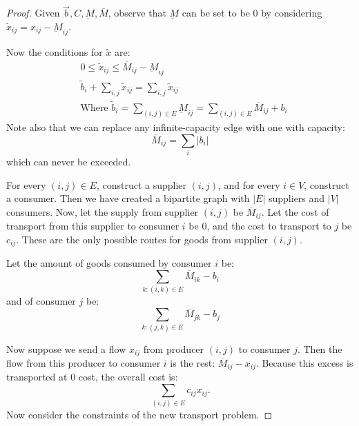 \documentclass[../Main.tex]{subfiles}
\begin{document}
\begin{proof}
    Given $\vec{b}, C, \underbar{M}, \overline{M}$, observe that $\underbar{M}$ can be set to be $0$ by considering $\tilde{x}_{ij} = x_{ij} - \underbar{M}_{ij}$.

    Now the conditions for $\tilde{x}$ are:
    \begin{align*}
        &0 \leq \tilde{x}_{ij} \leq \overline{M}_{ij} - \underbar{M}_{ij} \\
        &\tilde{b}_i + \sum_{i, j} \tilde{x}_{ij} = \sum_{i, j} \tilde{x}_{ij} \\
        &\text{Where } \tilde{b}_i = \sum_{(i, j) \in E} \underbar{M}_{ij} = \sum_{(i, j) \in E} \overline{M}_{ij} + b_i
    \end{align*}
    Note also that we can replace any infinite-capacity edge with one with capacity:
    \begin{equation*}
        \overline{M}_{ij} = \sum_i |b_i|
    \end{equation*}
    which can never be exceeded.

    For every $(i, j) \in E$, construct a supplier $(i, j)$, and for every $i \in V$, construct a consumer. Then we have created a bipartite graph with $|E|$ suppliers and $|V|$ consumers. Now, let the supply from supplier $(i, j)$ be $\overline{M}_{ij}$. Let the cost of transport from this supplier to consumer $i$ be 0, and the cost to transport to $j$ be $c_{ij}$. These are the only possible routes for goods from supplier $(i, j)$.
    
    Let the amount of goods consumed by consumer $i$ be:
    \begin{equation*}
        \sum_{k : (i, k) \in E} \overline{M}_{ik} - b_i
    \end{equation*}
    and of consumer $j$ be:
    \begin{equation*}
        \sum_{k : (j, k) \in E} \overline{M}_{jk} - b_j
    \end{equation*}

    Now suppose we send a flow $x_{ij}$ from producer $(i, j)$ to consumer $j$. Then the flow from this producer to consumer $i$ is the rest: $\overline{M}_{ij} - x_{ij}$. Because this excess is transported at $0$ cost, the overall cost is:
    \begin{equation*}
        \sum_{(i, j) \in E} c_{ij} x_{ij}.
    \end{equation*}
    Now consider the constraints of the new transport problem.
    

\end{proof}
\end{document}
